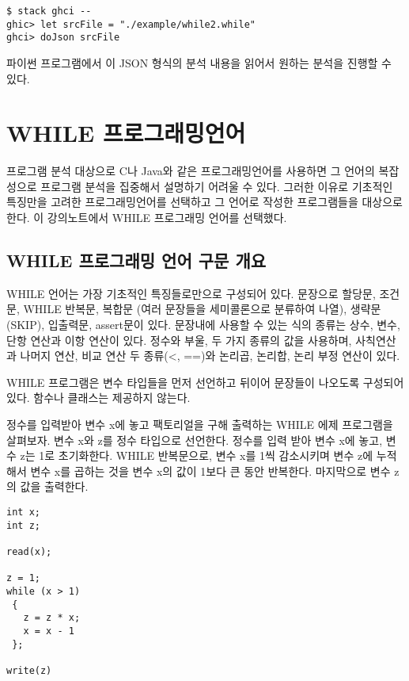 \documentclass[a4paper]{book}
\begin{document}
\begin{verbatim}
$ stack ghci --
ghic> let srcFile = "./example/while2.while"
ghci> doJson srcFile
\end{verbatim}

파이썬 프로그램에서 이 JSON 형식의 분석 내용을 읽어서 원하는 분석을
진행할 수 있다.

\chapter{WHILE 프로그래밍언어}

프로그램 분석 대상으로 C나 Java와 같은 프로그래밍언어를 사용하면 그
언어의 복잡성으로 프로그램 분석을 집중해서 설명하기 어려울 수 있다.
그러한 이유로 기초적인 특징만을 고려한 프로그래밍언어를 선택하고 그
언어로 작성한 프로그램들을 대상으로 한다. 이 강의노트에서 WHILE
프로그래밍 언어를 선택했다.

\section{WHILE 프로그래밍 언어 구문  개요}

WHILE 언어는 가장 기초적인 특징들로만으로 구성되어 있다. 문장으로
할당문, 조건문, WHILE 반복문, 복합문 (여러 문장들을 세미콜론으로
분류하여 나열), 생략문(SKIP), 입출력문, assert문이 있다. 문장내에
사용할 수 있는 식의 종류는 상수, 변수, 단항 연산과 이항 연산이
있다. 정수와 부울, 두 가지 종류의 값을 사용하며, 사칙연산과 나머지
연산, 비교 연산 두 종류(\textless, ==)와 논리곱, 논리합, 논리 부정
연산이 있다.

WHILE 프로그램은 변수 타입들을 먼저 선언하고 뒤이어 문장들이 나오도록
구성되어 있다. 함수나 클래스는 제공하지 않는다.

정수를 입력받아 변수 x에 놓고 팩토리얼을 구해 출력하는 WHILE 에제
프로그램을 살펴보자. 변수 x와 z를 정수 타입으로 선언한다. 정수를 입력
받아 변수 x에 놓고, 변수 z는 1로 초기화한다. WHILE 반복문으로, 변수
x를 1씩 감소시키며 변수 z에 누적해서 변수 x를 곱하는 것을 변수 x의
값이 1보다 큰 동안 반복한다. 마지막으로 변수 z의 값을 출력한다.

\begin{center}
\begin{minipage}[h]{.4\textwidth}
\begin{lstlisting}
int x;
int z;

read(x);

z = 1;
while (x > 1)
 {
   z = z * x;
   x = x - 1
 };

write(z)
\end{lstlisting}
\end{minipage}
\end{center}
\end{document}
